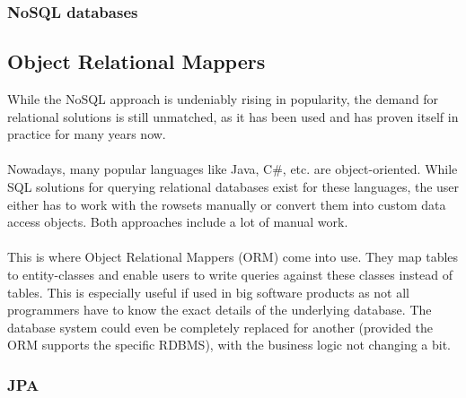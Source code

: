 \subsubsection{NoSQL databases}

\subsection{Object Relational Mappers}

While the NoSQL approach is undeniably rising in popularity, the demand for
relational solutions is still unmatched, as it has been used and has proven itself in practice
for many years now.
\\\\
Nowadays, many popular languages like Java, C\#, etc. are object-oriented.
While SQL solutions for querying relational databases exist for these languages, the user either has to work with the rowsets manually or convert them into custom data access objects. Both approaches include a lot of manual work.
\\\\
This is where Object Relational Mappers (ORM) come into use. They map tables to entity-classes and
enable users to write queries against these classes instead of tables. This is especially useful if used
in big software products as not all programmers have to know the exact details of the underlying database. The database system could even be completely replaced for another (provided the ORM supports the specific RDBMS), with the business logic not changing a bit.

\subsubsection{JPA}

